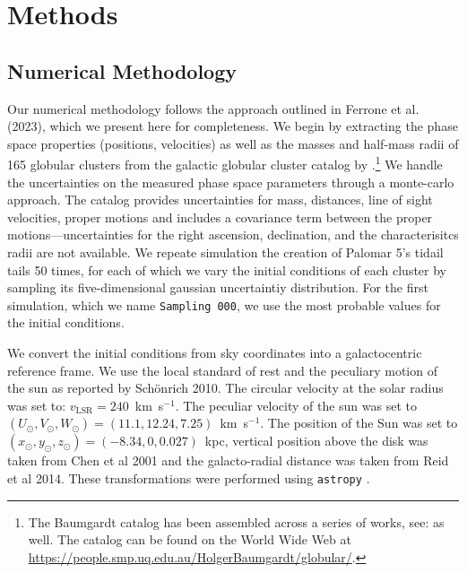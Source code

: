 \documentclass[draft]{aa}
\begin{document}
\section{Methods}

  \subsection{Numerical Methodology}
    Our numerical methodology follows the approach outlined in Ferrone et al. (2023), which we present here for completeness. We begin by extracting the phase space properties (positions, velocities) as well as the masses and half-mass radii of 165 globular clusters from the galactic globular cluster catalog by \cite{2021MNRAS.505.5957B}.\footnote{The Baumgardt catalog has been assembled across a series of works, see: \cite{2020PASA...37...46B,2019MNRAS.482.5138B,2018MNRAS.478.1520B} as well. The catalog can be found on the World Wide Web at \href{https://people.smp.uq.edu.au/HolgerBaumgardt/globular/}{https://people.smp.uq.edu.au/HolgerBaumgardt/globular/}.} We handle the uncertainties on the measured phase space parameters through a monte-carlo approach. The catalog provides uncertainties for mass, distances, line of sight velocities, proper motions and includes a covariance term between the proper motions---uncertainties for the right ascension, declination, and the characterisitcs radii are not available. We repeate simulation the creation of Palomar 5's tidail tails 50 times, for each of which we vary the initial conditions of each cluster by sampling its five-dimensional gaussian uncertaintiy distribution. For the first simulation, which we name \texttt{Sampling 000}, we use the most probable values for the initial conditions. 

    We convert the initial conditions from sky coordinates into a galactocentric reference frame. We use the local standard of rest and the peculiary motion of the sun as reported by Sch\"onrich 2010. The circular velocity at the solar radius was set to: $v_{\text{LSR}} = 240$~km~s$^{-1}$. The peculiar velocity of the sun was set to $(U_\odot, V_\odot, W_\odot)=(11.1, 12.24, 7.25)$~km~s$^{-1}$. The position of the Sun was set to $(x_\odot,y_\odot,z_\odot) = (-8.34,0,0.027)$~kpc, vertical position above the disk was taken from Chen et al 2001 and the galacto-radial distance was taken from Reid et al 2014. These transformations were performed using \texttt{astropy} \citep{2013A&A...558A..33A}.
\end{document}
